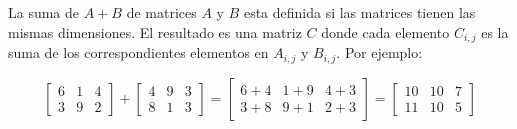 La suma de $A + B$ de matrices $A$ y $B$ esta definida si las matrices tienen las mismas dimensiones. El resultado es una matriz $C$ donde cada elemento $C_{i,j}$ es la suma de los correspondientes elementos en $A_{i,j}$ y $B_{i,j}$. Por ejemplo:

$$
\begin{bmatrix}
	6	& 1 & 4  \\
	3	& 9 & 2 
\end{bmatrix} +  \begin{bmatrix}
4	& 9 & 3  \\
8	& 1 & 3
\end{bmatrix} = \begin{bmatrix}
6+4 & 1+9 & 4+3  \\
3+8	& 9+1 & 2+3 
\end{bmatrix} = \begin{bmatrix}
10	& 10 & 7  \\
11	& 10 & 5 
\end{bmatrix} $$